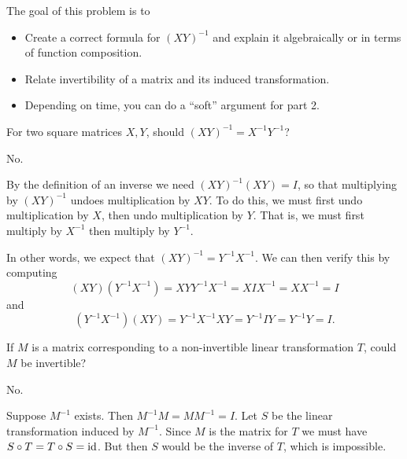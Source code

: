 \documentclass{workbook}
\newcommand{\bookonlynewpage}{\begin{bookonly}\newpage\end{bookonly}}
\begin{document}
\begin{slide}

	\bookonlynewpage
	\question
	\begin{annotation}
		\begin{goals}

			The goal of this problem is to
			\begin{itemize}
				\item Create a correct formula for $(XY)^{-1}$ and
					explain it algebraically or in terms of
					function composition.
				\item Relate invertibility of a matrix and its induced transformation.
			\end{itemize}
		\end{goals}

		\begin{notes}
			\begin{itemize}
				\item Depending on time, you can do a ``soft'' argument for part 2.
			\end{itemize}
		\end{notes}
	\end{annotation}
	\begin{parts}
		\item For two square matrices $X,Y$, should $(XY)^{-1}=X^{-1}Y^{-1}$?
			\begin{solution}
				No.

				By the definition of an inverse we need $(XY)^{-1}(XY)=I$, so
				that multiplying by $(XY)^{-1}$ undoes multiplication
				by $XY$. To do this, we must first undo multiplication by $X$,
				then undo multiplication by $Y$. That is, we must first multiply
				by $X^{-1}$ then multiply by $Y^{-1}$.

				In other words, we expect that $(XY)^{-1} = Y^{-1}X^{-1}$. We can
				then verify this by computing
				\[
					(XY)(Y^{-1}X^{-1}) = XYY^{-1}X^{-1} = XIX^{-1} = XX^{-1} = I
				\]
				and
				\[
					(Y^{-1}X^{-1})(XY) = Y^{-1}X^{-1}XY = Y^{-1}IY = Y^{-1}Y = I.
				\]
			\end{solution}
		\item If $M$ is a matrix corresponding to a non-invertible linear transformation $T$,
			could $M$ be invertible?
			\begin{solution}
				No.

				Suppose $M^{-1}$ exists. Then $M^{-1}M=MM^{-1}=I$.
				Let $S$ be the linear transformation induced by $M^{-1}$.
				Since $M$ is the matrix for $T$ we must have $S\circ T=T\circ S=\operatorname{id}$. But
				then $S$ would be the inverse of $T$, which is impossible.
			\end{solution}
	\end{parts}
\end{slide}
\end{document}
